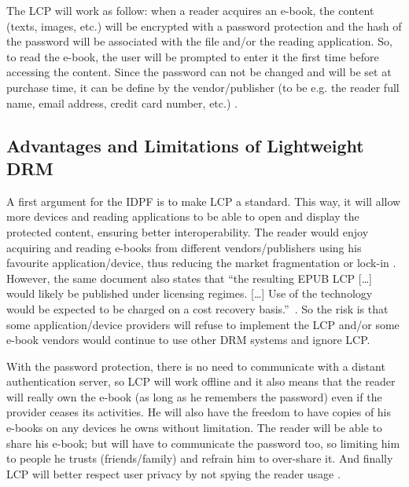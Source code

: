 \documentclass[11pt,a4paper,oneside]{memoir}
\begin{document}
The LCP will work as follow: when a reader acquires an e-book, the content (texts, images, etc.) will be encrypted with a password protection and the hash of the password will be associated with the file and/or the reading application. So, to read the e-book, the user will be prompted to enter it the first time before accessing the content. Since the password can not be changed and will be set at purchase time, it can be define by the vendor/publisher (to be e.g. the reader full name, email address, credit card number, etc.) \cite{idpf:lcp-uc}.



\subsection{Advantages and Limitations of Lightweight DRM}

A first argument for the IDPF is to make LCP a standard. This way, it will allow more devices and reading applications to be able to open and display the protected content, ensuring better interoperability. The reader would enjoy acquiring and reading e-books from different vendors/publishers using his favourite application/device, thus reducing the market fragmentation or lock-in \cite[Why Consider LCP for EPUB? section]{idpf:lcp-uc}. However, the same document also states that \textquotedblleft the resulting EPUB LCP [\ldots] would likely be published under licensing regimes. [\ldots] Use of the technology would be expected to be charged on a cost recovery basis.\textquotedblright ~\cite[What Is the Recommended Process For Defining LCP for EPUB? section]{idpf:lcp-uc}. So the risk is that some application/device providers will refuse to implement the LCP and/or some e-book vendors would continue to use other DRM systems and ignore LCP.

With the password protection, there is no need to communicate with a distant authentication server, so LCP will work offline and it also means that the reader will really own the e-book (as long as he remembers the password) even if the provider ceases its activities. He will also have the freedom to have copies of his e-books on any devices he owns without limitation. 
The reader will be able to share his e-book; but will have to communicate the password too, so limiting him to people he trusts (friends/family) and refrain him to over-share it.
And finally LCP will better respect user privacy by not spying the reader usage \cite[Why Consider LCP for EPUB? and What Is LCP? sections]{idpf:lcp-uc}.
\end{document}
